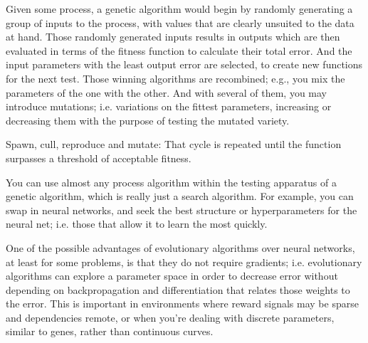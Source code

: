 Given some process, a genetic algorithm would begin by randomly generating a group of inputs to the process, with values that are clearly unsuited to the data at hand. Those randomly generated inputs results in outputs which  are then evaluated in terms of the fitness function to calculate their total error. And the input parameters with the least output error are selected, to create new functions for the next test. Those winning algorithms are recombined; e.g., you mix the parameters of the one with the other. And with several of them, you may introduce mutations; i.e. variations on the fittest parameters, increasing or decreasing them with the purpose of testing the mutated variety.

Spawn, cull, reproduce and mutate: That cycle is repeated until the function surpasses a threshold of  acceptable fitness.

You can use almost any process algorithm within the testing apparatus of a genetic algorithm, which is really just a search algorithm. For example, you can swap in neural networks, and seek the best structure or hyperparameters for the neural net; i.e. those that allow it to learn the most quickly.

One of the possible advantages of evolutionary algorithms over neural networks, at least for some problems, is that they do not require gradients; i.e. evolutionary algorithms can explore a parameter space in order to decrease error without depending on backpropagation and differentiation that relates those weights to the error. This is important in environments where reward signals may be sparse and dependencies remote, or when you’re dealing with discrete parameters, similar to genes, rather than continuous curves.



